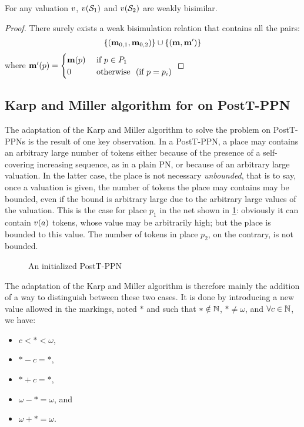 \begin{lemm}
  For any valuation $\val$, $\val[{\namePPN[1]}]$ and $\val[{\namePPN[2]}]$ are weakly bisimilar.
 \end{lemm}

\begin{proof}
  There surely exists a weak bisimulation relation that contains all the pairs:
  \begin{align*}
    \{ ( \mathbf{m}_{0,1}, \mathbf{m}_{0,2} ) \}
    \cup
    \{ (\mathbf{m}, \mathbf{m}') \}
  \end{align*}
  where $\mathbf{m}'(p) = \begin{cases}\mathbf{m}(p) &\text{ if } p \in P_1\\0&\text{ otherwise }\text{ (if $p = p_i$)}\end{cases}$
\end{proof}

\subsection{Karp and Miller algorithm for \Ecov on PostT-\ac{PPN}}
\label{sec:km-ecov-postt-ppn}

The adaptation of the Karp and Miller algorithm to solve the \Ecov problem on PostT-\acp{PPN} is the result of one key observation.
In a PostT-\ac{PPN}, a place may contains an arbitrary large number of tokens either because of the presence of a self-covering increasing sequence, as in a plain \ac{PN}, or because of an arbitrary large valuation.
In the latter case, the place is not necessary \emph{unbounded}, that is to say, once a valuation is given, the number of tokens the place may contains may be bounded, even if the bound is arbitrary large due to the arbitrary large values of the valuation.
This is the case for place $p_1$ in the net shown in \cref{fig:postt-ppn-bound}: obviously it can contain $\val(\param)$ tokens, whose value may be arbitrarily high; but the place is bounded to this value.
The number of tokens in place $p_2$, on the contrary, is not bounded.

\begin{figure}[htbp]
  \centering
  
  \par
  \caption{An initialized PostT-\ac{PPN}}
  \label{fig:postt-ppn-bound}
\end{figure}

The adaptation of the Karp and Miller algorithm is therefore mainly the addition of a way to distinguish between these two cases.
\label{defi:star}
It is done by introducing a new value allowed in the markings, noted $*$ and such that $* \notin \mathbb{N}$, $* \neq \omega$, and $\forall c \in \mathbb{N}$, we have:
\begin{itemize}
  \item $c < * < \omega$,
  \item $* - c = *$,
  \item $* + c = *$,
  \item $\omega - * = \omega$, and
  \item $\omega + * = \omega$.
\end{itemize}

